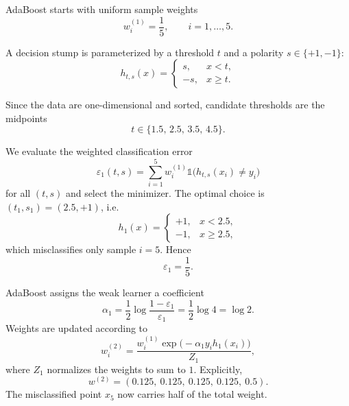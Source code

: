 \documentclass[../main]{subfiles}
\begin{document}
\begin{solution}
    AdaBoost starts with uniform sample weights
    \[
    w_i^{(1)}=\frac{1}{5},\qquad i=1,\dots,5.
    \]
    
    A decision stump is parameterized by a threshold $t$ and a polarity
    $s\in\{+1,-1\}$:
    \[
    h_{t,s}(x)=
    \begin{cases}
    s, & x<t,\\
    -s, & x\ge t.
    \end{cases}
    \]
    
    Since the data are one-dimensional and sorted, candidate thresholds are the
    midpoints
    \[
    t\in\{1.5,\,2.5,\,3.5,\,4.5\}.
    \]
    
    We evaluate the weighted classification error
    \[
    \varepsilon_1(t,s)
    =\sum_{i=1}^5 w_i^{(1)}\mathbb 1\bigl(h_{t,s}(x_i)\neq y_i\bigr)
    \]
    for all $(t,s)$ and select the minimizer.  
    The optimal choice is $(t_1,s_1)=(2.5,+1)$, i.e.
    \[
    h_1(x)=
    \begin{cases}
    +1,& x<2.5,\\
    -1,& x\ge 2.5,
    \end{cases}
    \]
    which misclassifies only sample $i=5$. Hence
    \[
    \varepsilon_1=\frac{1}{5}.
    \]
    
    AdaBoost assigns the weak learner a coefficient
    \[
    \alpha_1=\frac12\log\frac{1-\varepsilon_1}{\varepsilon_1}
    =\frac12\log 4=\log 2.
    \]
    Weights are updated according to
    \[
    w_i^{(2)}
    =\frac{w_i^{(1)}\exp\bigl(-\alpha_1 y_i h_1(x_i)\bigr)}{Z_1},
    \]
    where $Z_1$ normalizes the weights to sum to $1$.
    Explicitly,
    \[
    w^{(2)}=(0.125,\ 0.125,\ 0.125,\ 0.125,\ 0.5).
    \]
    The misclassified point $x_5$ now carries half of the total weight.
    

\end{solution}
\end{document}
